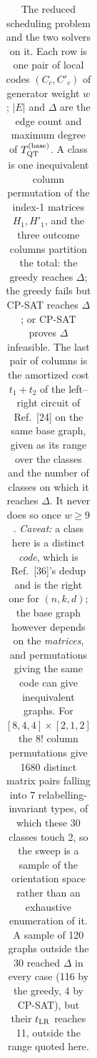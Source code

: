 \begin{table}
\begin{tabular}{@{}llr rr rrrr rr rr@{}}
\bottomrule
\end{tabular}
\caption{The reduced scheduling problem and the two solvers on it. Each row is
one pair of local codes $(C_c,C'_c)$ of generator weight $w$; $|E|$ and $\Delta$
are the edge count and maximum degree of $T^{(\rm base)}_{\rm QT}$. A class is
one inequivalent column permutation of the index-1 matrices $H_1,H'_1$, and the
three outcome columns partition the total: the greedy reaches $\Delta$; the
greedy fails but CP-SAT reaches $\Delta$; or CP-SAT proves $\Delta$ infeasible.
The last pair of columns is the amortized cost $t_1{+}t_2$ of the left--right
circuit of Ref.~[24] on the same base graph, given as its range over the classes
and the number of classes on which it reaches $\Delta$. It never does so once
$w\geq9$. \emph{Caveat:} a class here is a distinct \emph{code}, which is
Ref.~[36]'s dedup and is the right one for $(n,k,d)$; the base graph however
depends on the \emph{matrices}, and permutations giving the same code can give
inequivalent graphs. For $[8,4,4]\times[2,1,2]$ the $8!$ column permutations
give 1680 distinct matrix pairs falling into 7 relabelling-invariant types, of
which these 30 classes touch 2, so the sweep is a sample of the orientation
space rather than an exhaustive enumeration of it. A sample of 120 graphs
outside the 30 reached $\Delta$ in every case (116 by the greedy, 4 by
CP-SAT), but their $t_{\rm LR}$ reaches 11, outside the range quoted here.}
\label{tab:qt-base}
\end{table}

